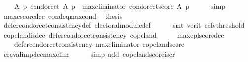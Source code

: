 \begin{isabellebody}
\ \ \ \ {\isachardoublequoteopen}{\isasymAnd}A\ p{\isachardot}{\kern0pt}\ {\isacharparenleft}{\kern0pt}condorcet\ A\ p\ {\isasymequiv}\ max{\isacharunderscore}{\kern0pt}eliminator\ condorcet{\isacharunderscore}{\kern0pt}score\ A\ p{\isacharparenright}{\kern0pt}{\isachardoublequoteclose}\isanewline
\ \ \ \ \isamarkupfalse%
\ simp\isanewline
\ \ \isamarkupfalse%
\ max{\isacharunderscore}{\kern0pt}cscore{\isacharunderscore}{\kern0pt}dcc\ cond{\isacharunderscore}{\kern0pt}eq{\isacharunderscore}{\kern0pt}max{\isacharunderscore}{\kern0pt}cond\ \isamarkupfalse%
\ {\isacharquery}{\kern0pt}thesis\isanewline
\ \ \ \ \isamarkupfalse%
\ defer{\isacharunderscore}{\kern0pt}condorcet{\isacharunderscore}{\kern0pt}consistency{\isacharunderscore}{\kern0pt}def\ electoral{\isacharunderscore}{\kern0pt}module{\isacharunderscore}{\kern0pt}def\isanewline
\ \ \ \ \isamarkupfalse%
\ {\isacharparenleft}{\kern0pt}smt\ {\isacharparenleft}{\kern0pt}verit{\isacharcomma}{\kern0pt}\ ccfv{\isacharunderscore}{\kern0pt}threshold{\isacharparenright}{\kern0pt}{\isacharparenright}{\kern0pt}\isanewline
{}\isamarkupfalse%
%
\endisatagproof
{\isafoldproof}%
%
\isadelimproof
\isanewline
%
\endisadelimproof
\isanewline
{}\isamarkupfalse%
\ copeland{\isacharunderscore}{\kern0pt}is{\isacharunderscore}{\kern0pt}dcc{\isacharcolon}{\kern0pt}\ {\isachardoublequoteopen}defer{\isacharunderscore}{\kern0pt}condorcet{\isacharunderscore}{\kern0pt}consistency\ copeland{\isachardoublequoteclose}\isanewline
%
\isadelimproof
%
\endisadelimproof
%
\isatagproof
{}\isamarkupfalse%
\ {\isacharminus}{\kern0pt}\isanewline
\ \ \isamarkupfalse%
\ max{\isacharunderscore}{\kern0pt}cplscore{\isacharunderscore}{\kern0pt}dcc{\isacharcolon}{\kern0pt}\isanewline
\ \ \ \ {\isachardoublequoteopen}defer{\isacharunderscore}{\kern0pt}condorcet{\isacharunderscore}{\kern0pt}consistency\ {\isacharparenleft}{\kern0pt}max{\isacharunderscore}{\kern0pt}eliminator\ copeland{\isacharunderscore}{\kern0pt}score{\isacharparenright}{\kern0pt}{\isachardoublequoteclose}\isanewline
\ \ \ \ \isamarkupfalse%
\ cr{\isacharunderscore}{\kern0pt}eval{\isacharunderscore}{\kern0pt}imp{\isacharunderscore}{\kern0pt}dcc{\isacharunderscore}{\kern0pt}max{\isacharunderscore}{\kern0pt}elim\isanewline
\ \ \ \ \isamarkupfalse%
\ {\isacharparenleft}{\kern0pt}simp\ add{\isacharcolon}{\kern0pt}\ copeland{\isacharunderscore}{\kern0pt}score{\isacharunderscore}{\kern0pt}is{\isacharunderscore}{\kern0pt}cr{\isacharparenright}{\kern0pt}\isanewline

\end{isabellebody}
